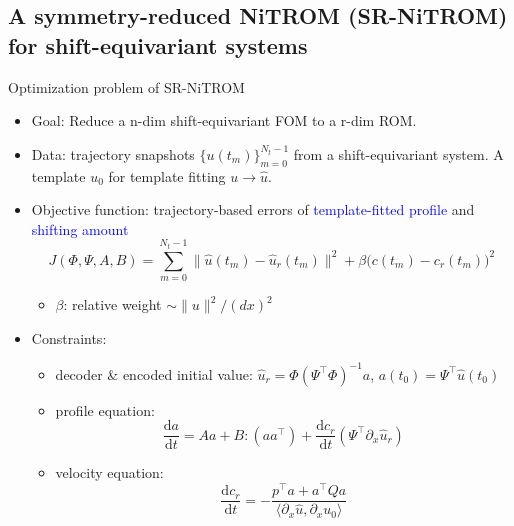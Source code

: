 \documentclass[presentation]{beamer}
\begin{document}
\subsection{A symmetry-reduced NiTROM (SR-NiTROM) for shift-equivariant systems}
\label{sec:orgd97c086}
\begin{frame}[label={sec:orgf4136e8}]{Optimization problem of SR-NiTROM}
\begin{itemize}[<+->]
\item Goal: Reduce a n-dim shift-equivariant FOM to a r-dim ROM.
\item Data: trajectory snapshots \(\{u(t_{m})\}_{m = 0}^{N_{t} - 1}\) from a shift-equivariant system. A template \(u_{0}\) for template fitting \(u\to\widehat{u}\).
\item Objective function: trajectory-based errors of \textcolor{blue}{template-fitted profile} and \textcolor{blue}{shifting amount} 
\begin{equation}
  \label{eq:6}
  J(\Phi, \Psi, A, B) = \sum_{m = 0}^{N_{t}-1} \|\widehat{u}(t_{m}) - \widehat{u}_{r}(t_{m})\|^{2} + \beta\bigg(c(t_{m}) - c_{r}(t_{m})\bigg)^{2}
\end{equation}
\begin{itemize}
\item \(\beta\): relative weight \(\sim \|u\|^{2}/(dx)^{2}\)
\end{itemize}
\item Constraints:
\begin{itemize}
\item decoder \& encoded initial value: \(\widehat{u}_{r} = \Phi(\Psi^{\top}\Phi)^{-1}a\), \(a(t_{0}) = \Psi^{\top}\widehat{u}(t_{0})\)
\item profile equation: 
\begin{equation}
  \label{eq:7}
  \frac{\mathrm{d}a}{\mathrm{d}t} = Aa + B:(aa^{\top}) + \frac{\mathrm{d}c_{r}}{\mathrm{d}t}(\Psi^{\top}\partial_{x}\widehat{u}_{r})
\end{equation}
\item velocity equation:
\begin{equation}
  \label{eq:8}
  \frac{\mathrm{d}c_{r}}{\mathrm{d}t} = -\frac{p^{\top}a + a^{\top}Qa}{\langle\partial_{x}\widehat{u}, \partial_{x}u_{0}\rangle}
\end{equation}
\end{itemize}
\end{itemize}
\end{frame}
\end{document}
